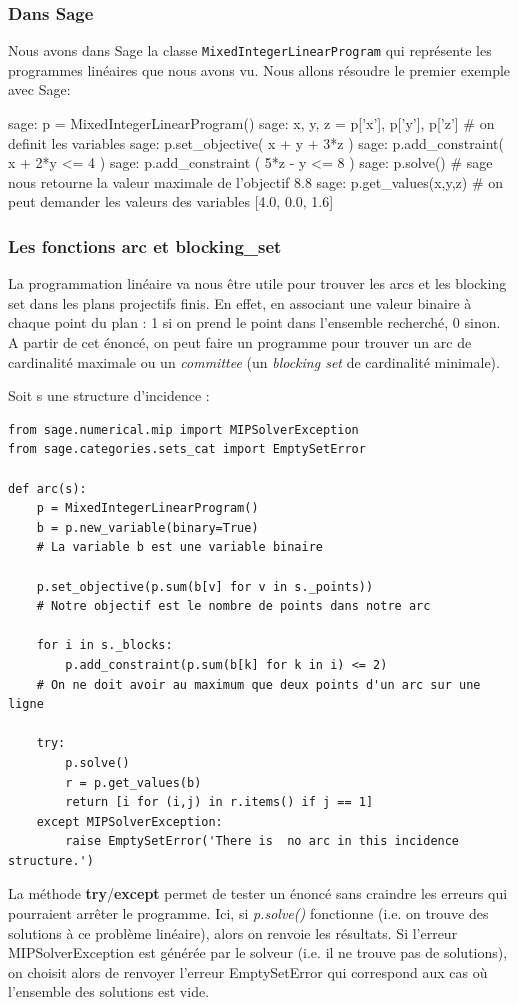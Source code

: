 \documentclass[a4paper]{article}
\begin{document}
\subsubsection*{Dans Sage}
Nous avons dans Sage la classe \texttt{MixedIntegerLinearProgram} qui représente les programmes linéaires que nous avons vu.
Nous allons résoudre le premier exemple avec Sage:
\begin{sageverbatim}
 sage: p = MixedIntegerLinearProgram()
 sage: x, y, z = p['x'], p['y'], p['z']    # on definit les variables
 sage: p.set_objective( x + y + 3*z )
 sage: p.add_constraint( x + 2*y <= 4 )
 sage: p.add_constraint ( 5*z - y <= 8 )
 sage: p.solve()         # sage nous retourne la valeur maximale de l'objectif
 8.8
 sage: p.get_values(x,y,z)    # on peut demander les valeurs des variables
 [4.0, 0.0, 1.6]
\end{sageverbatim}
\subsubsection*{Les fonctions arc et blocking\_set}
La programmation linéaire va nous être utile pour trouver les arcs et les blocking set dans les plans projectifs finis. En effet, en associant une valeur binaire à chaque point du plan : 1 si on prend le point dans l'ensemble recherché, 0 sinon.\\
A partir de cet énoncé, on peut faire un programme pour trouver un arc de cardinalité maximale ou un \textit{committee} (un \textit{blocking set} de cardinalité minimale).

Soit s une structure d'incidence :

\begin{lstlisting}
from sage.numerical.mip import MIPSolverException
from sage.categories.sets_cat import EmptySetError
          
def arc(s):   
    p = MixedIntegerLinearProgram()
    b = p.new_variable(binary=True)
    # La variable b est une variable binaire 

    p.set_objective(p.sum(b[v] for v in s._points))
    # Notre objectif est le nombre de points dans notre arc 

    for i in s._blocks:
        p.add_constraint(p.sum(b[k] for k in i) <= 2)
    # On ne doit avoir au maximum que deux points d'un arc sur une ligne 
        
    try:
        p.solve()
        r = p.get_values(b)
        return [i for (i,j) in r.items() if j == 1]
    except MIPSolverException:
        raise EmptySetError('There is  no arc in this incidence structure.')
\end{lstlisting}
La méthode \textbf{try}/\textbf{except} permet de tester un énoncé sans craindre les erreurs qui pourraient arrêter le programme. Ici, si \textit{p.solve()} fonctionne (i.e. on trouve des solutions à ce problème linéaire), alors on renvoie les résultats. Si l'erreur MIPSolverException est générée par le solveur (i.e. il ne trouve pas de solutions), on choisit alors de renvoyer l'erreur EmptySetError qui correspond aux cas où l'ensemble des solutions est vide.
\end{document}
